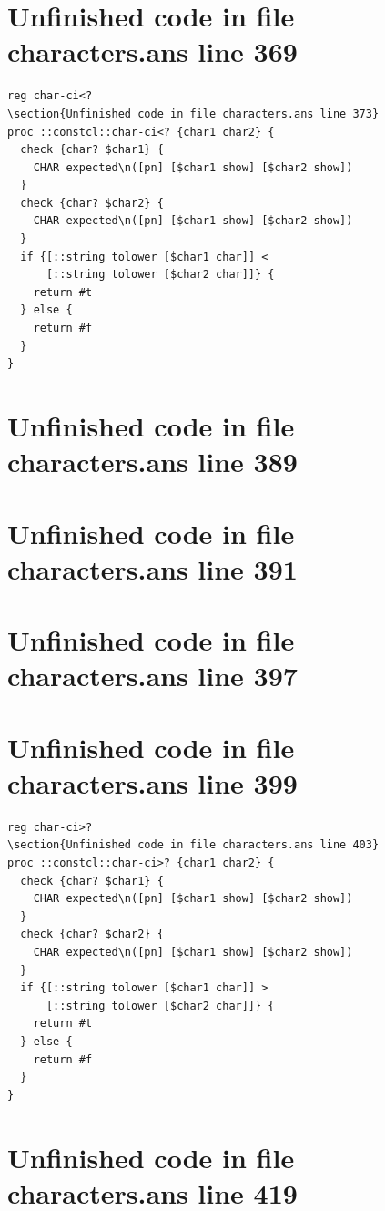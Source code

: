 \documentclass[twoside,9pt]{report}
\begin{document}
\section{Unfinished code in file characters.ans line 369}
\begin{lstlisting}
reg char-ci<?
\section{Unfinished code in file characters.ans line 373}
proc ::constcl::char-ci<? {char1 char2} {
  check {char? $char1} {
    CHAR expected\n([pn] [$char1 show] [$char2 show])
  }
  check {char? $char2} {
    CHAR expected\n([pn] [$char1 show] [$char2 show])
  }
  if {[::string tolower [$char1 char]] <
      [::string tolower [$char2 char]]} {
    return #t
  } else {
    return #f
  }
}
\end{lstlisting}
\section{Unfinished code in file characters.ans line 389}
\section{Unfinished code in file characters.ans line 391}
\section{Unfinished code in file characters.ans line 397}
\section{Unfinished code in file characters.ans line 399}
\begin{lstlisting}
reg char-ci>?
\section{Unfinished code in file characters.ans line 403}
proc ::constcl::char-ci>? {char1 char2} {
  check {char? $char1} {
    CHAR expected\n([pn] [$char1 show] [$char2 show])
  }
  check {char? $char2} {
    CHAR expected\n([pn] [$char1 show] [$char2 show])
  }
  if {[::string tolower [$char1 char]] >
      [::string tolower [$char2 char]]} {
    return #t
  } else {
    return #f
  }
}
\end{lstlisting}
\section{Unfinished code in file characters.ans line 419}
\end{document}
